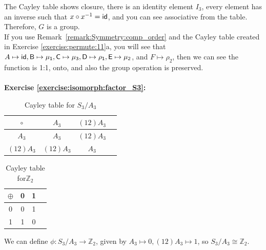 \noindent
The Cayley table shows closure, there is an identity element $I_3$, every element has an inverse such that $x \circ x^{-1} = \sf{id}$, and you can see associative from the table. Therefore, $G$ is a group.  
\\
If you use Remark~\ref{remark:Symmetry:comp_order} and the Cayley table created in Exercise \ref{exercise:permute:11}a, you will see that $A \mapsto \sf{id}, B \mapsto \mu_1, C \mapsto \mu_3, D \mapsto \rho_1, E \mapsto \mu_2$, and $F \mapsto \rho_2$, then we can see the function is 1:1, onto, and also the group operation is preserved. 
\\
\\

\noindent\textbf{Exercise \ref{exercise:isomorph:factor_S3}:}
\begin{multicols}{2}
\begin{table}[H]
\caption{Cayley table for $S_3/A_3$}
{\small
\begin{center}
\begin{tabular}{c|ccc}
$\circ$ &$ A_3$ & $(12)A_3$  \\
\hline
$A_3$        &$A_3$ &$ (12)A_3$  \\
$(12)A_3$  & $(12)A_3$  &$A_3$   \\
\end{tabular}
\end{center}
}
\end{table}

\begin{table}[H]
\caption{Cayley table for${\mathbb Z}_2$}
{\small
\begin{center}
\begin{tabular}{c|ccc}
$\oplus$ & 0 & 1 \\

\hline
0 & 0 & 1 \\ 
1& 1 & 0 \\
\end{tabular}
\end{center}
}
\end{table}
\end{multicols}
\noindent We can define $\phi:S_3/A_3 \rightarrow {\mathbb Z}_2$,  given by  $A_3\mapsto 0,  (12)A_3 \mapsto 1$, so $S_3/A_3 \cong {\mathbb Z}_2$.
\\
\\

